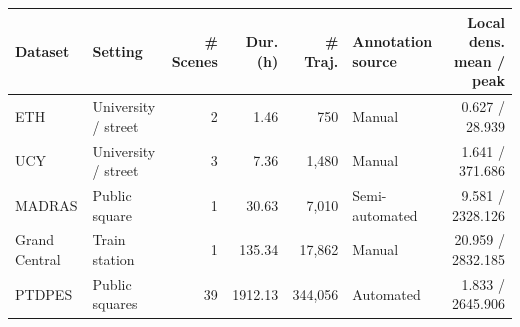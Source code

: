 \begin{tabular}{llrrrlr}
\hline
Dataset & Setting & \# Scenes & Dur. (h) & \# Traj. & Annotation source & Local dens. mean / peak \\
\hline
ETH & University / street & 2 & 1.46 & 750 & Manual & 0.627 / 28.939 \\
UCY & University / street & 3 & 7.36 & 1{,}480 & Manual & 1.641 / 371.686 \\
MADRAS & Public square & 1 & 30.63 & 7{,}010 & Semi-automated & 9.581 / 2328.126 \\
Grand Central & Train station & 1 & 135.34 & 17{,}862 & Manual & 20.959 / 2832.185 \\
PTDPES & Public squares & 39 & 1912.13 & 344{,}056 & Automated & 1.833 / 2645.906 \\
\hline
\end{tabular}
